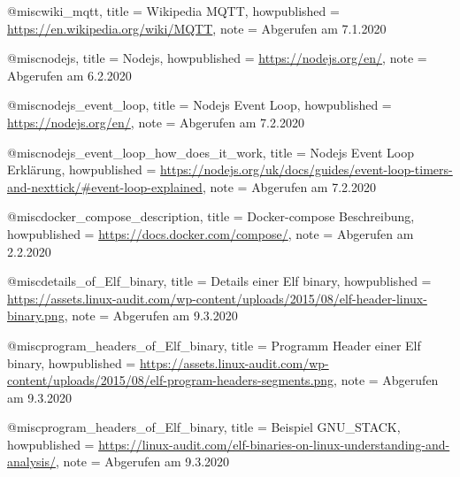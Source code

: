 @misc{wiki_mqtt, 
		title  = {{Wikipedia MQTT}},
		howpublished = {\newline  \url{https://en.wikipedia.org/wiki/MQTT}},
		note  =  {\newline Abgerufen am 7.1.2020}
}

@misc{nodejs, 
		title  = {{Nodejs}},
		howpublished = {\newline  \url{https://nodejs.org/en/}},
		note  =  {\newline Abgerufen am 6.2.2020}
}

@misc{nodejs_event_loop, 
		title  = {{Nodejs Event Loop}},
		howpublished = {\newline  \url{https://nodejs.org/en/}},
		note  =  {\newline Abgerufen am 7.2.2020}
}

@misc{nodejs_event_loop_how_does_it_work, 
		title  = {{Nodejs Event Loop Erklärung}},
		howpublished = {\newline  \url{https://nodejs.org/uk/docs/guides/event-loop-timers-and-nexttick/#event-loop-explained}},
		note  =  {\newline Abgerufen am 7.2.2020}
}

@misc{docker_compose_description, 
		title  = {{Docker-compose Beschreibung}},
		howpublished = {\newline  \url{https://docs.docker.com/compose/}},
		note  =  {\newline Abgerufen am 2.2.2020}
}

@misc{details_of_Elf_binary,
  title = {{Details einer Elf binary}},
  howpublished = {\newline  \url{https://assets.linux-audit.com/wp-content/uploads/2015/08/elf-header-linux-binary.png}},
  note  =  {\newline Abgerufen am 9.3.2020}
}

@misc{program_headers_of_Elf_binary,
  title = {{Programm Header einer Elf binary}},
  howpublished = {\newline  \url{https://assets.linux-audit.com/wp-content/uploads/2015/08/elf-program-headers-segments.png}},
  note  =  {\newline Abgerufen am 9.3.2020}
}

@misc{program_headers_of_Elf_binary,
  title = {{Beispiel GNU_STACK}},
  howpublished = {\newline  \url{https://linux-audit.com/elf-binaries-on-linux-understanding-and-analysis/}},
  note  =  {\newline Abgerufen am 9.3.2020}
}

